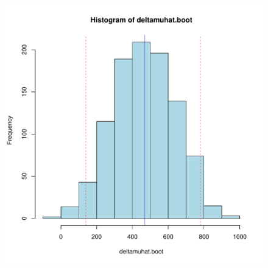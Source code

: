 \documentclass[10pt,handout]{beamer}\usepackage[]{graphicx}\usepackage[]{color}
\makeatletter
\def\maxwidth{ %
  \ifdim\Gin@nat@width>\linewidth
    \linewidth
  \else
    \Gin@nat@width
  \fi
}
\newenvironment{knitrout}{}{} %
\makeatother
\begin{document}
\begin{frame}
\begin{figure}
\begin{minipage}[h]{0.45\linewidth}
\begin{knitrout}
{\centering \includegraphics[width=\maxwidth]{figure/unnamed-chunk-9-1} 

}


\end{knitrout}
		\end{minipage}
	\end{figure}
	
	
\end{frame}
\end{document}
